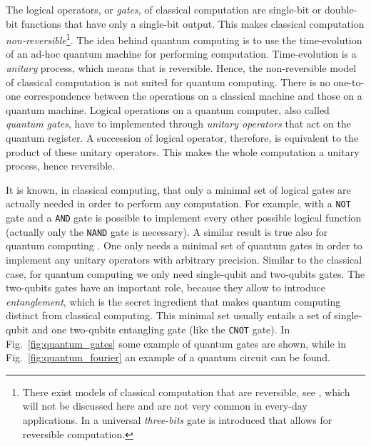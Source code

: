 \begin{figure}[t]
\end{figure}


The logical operators, or \emph{gates}, of classical computation are single-bit or double-bit functions that have only a single-bit output.
This makes classical computation \emph{non-reversible}\footnote{%
    There exist models of classical computation that are reversible, see \cite{fredkin1982logic}, which will not be discussed here and are not very common in every-day applications.
    In \cite{fredkin1982logic} a universal \emph{three-bits} gate is introduced that allows for reversible computation.%
}.
The idea behind quantum computing is to use the time-evolution of an ad-hoc quantum machine for performing computation.
Time-evolution is a \emph{unitary} process, which means that is reversible.
Hence, the non-reversible model of classical computation is not suited for quantum computing.
There is no one-to-one correspondence between the operations on a classical machine and those on a quantum machine.
Logical operations on a quantum computer, also called \emph{quantum gates}, have to implemented through \emph{unitary operators} that act on the quantum register.
A succession of logical operator, therefore, is equivalent to the product of these unitary operators.
This makes the whole computation a unitary process, hence reversible.

It is known, in classical computing, that only a minimal set of logical gates are actually needed in order to perform any computation.
For example, with a \texttt{NOT} gate and a \texttt{AND} gate is possible to implement every other possible logical function (actually only the \texttt{NAND} gate is necessary).
A similar result is true also for quantum computing \cite{barenco1995gates}.
One only needs a minimal set of quantum gates in order to implement any unitary operators with arbitrary precision.
Similar to the classical case, for quantum computing we only need single-qubit and two-qubits gates.
The two-qubits gates have an important role, because they allow to introduce \emph{entanglement}, which is the secret ingredient that makes quantum computing distinct from classical computing.
This minimal set usually entails a set of single-qubit and one two-qubits entangling gate (like the \texttt{CNOT} gate).
In Fig.~\ref{fig:quantum_gates} some example of quantum gates are shown, while in Fig.~\ref{fig:quantum_fourier} an example of a quantum circuit can be found.

